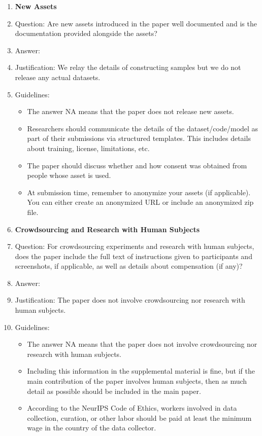 \documentclass{article}
\begin{document}
\begin{enumerate}
\item {\bf New Assets}
    \item[] Question: Are new assets introduced in the paper well documented and is the documentation provided alongside the assets?
    \item[] Answer: \answerNA{} %
    \item[] Justification: We relay the details of constructing samples but we do not release any actual datasets.
    \item[] Guidelines:
    \begin{itemize}
        \item The answer NA means that the paper does not release new assets.
        \item Researchers should communicate the details of the dataset/code/model as part of their submissions via structured templates. This includes details about training, license, limitations, etc. 
        \item The paper should discuss whether and how consent was obtained from people whose asset is used.
        \item At submission time, remember to anonymize your assets (if applicable). You can either create an anonymized URL or include an anonymized zip file.
    \end{itemize}

\item {\bf Crowdsourcing and Research with Human Subjects}
    \item[] Question: For crowdsourcing experiments and research with human subjects, does the paper include the full text of instructions given to participants and screenshots, if applicable, as well as details about compensation (if any)? 
    \item[] Answer: \answerNA{} %
    \item[] Justification: The paper does not involve crowdsourcing nor research with human subjects.
    \item[] Guidelines:
    \begin{itemize}
        \item The answer NA means that the paper does not involve crowdsourcing nor research with human subjects.
        \item Including this information in the supplemental material is fine, but if the main contribution of the paper involves human subjects, then as much detail as possible should be included in the main paper. 
        \item According to the NeurIPS Code of Ethics, workers involved in data collection, curation, or other labor should be paid at least the minimum wage in the country of the data collector. 
    \end{itemize}


\end{enumerate}
\end{document}
